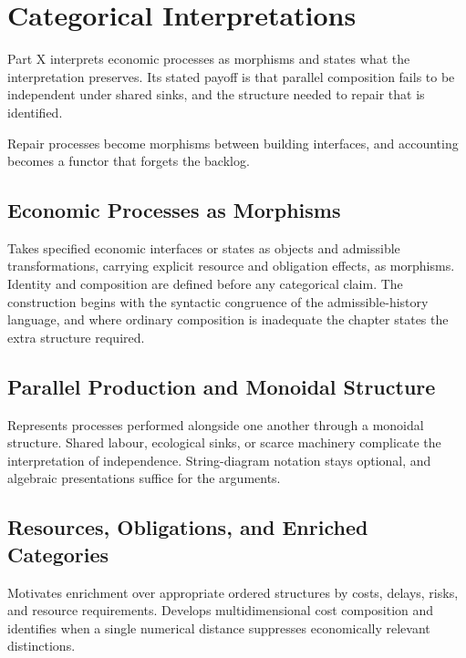 \part{Categorical Interpretations}
\label{part:X}

Part X interprets economic processes as morphisms and states what the interpretation preserves. Its stated payoff is that parallel composition fails to be independent under shared sinks, and the structure needed to repair that is identified.

\begin{housing}Repair processes become morphisms between building interfaces, and accounting becomes a functor that forgets the backlog.\end{housing}

\chapter{Economic Processes as Morphisms}\label{ch:46}
Takes specified economic interfaces or states as objects and admissible transformations, carrying explicit resource and obligation effects, as morphisms. Identity and composition are defined before any categorical claim. The construction begins with the syntactic congruence of the admissible-history language, and where ordinary composition is inadequate the chapter states the extra structure required.
\scaffold

\chapter{Parallel Production and Monoidal Structure}\label{ch:47}
Represents processes performed alongside one another through a monoidal structure. Shared labour, ecological sinks, or scarce machinery complicate the interpretation of independence. String-diagram notation stays optional, and algebraic presentations suffice for the arguments.
\scaffold

\chapter{Resources, Obligations, and Enriched Categories}\label{ch:48}
Motivates enrichment over appropriate ordered structures by costs, delays, risks, and resource requirements. Develops multidimensional cost composition and identifies when a single numerical distance suppresses economically relevant distinctions.
\scaffold

